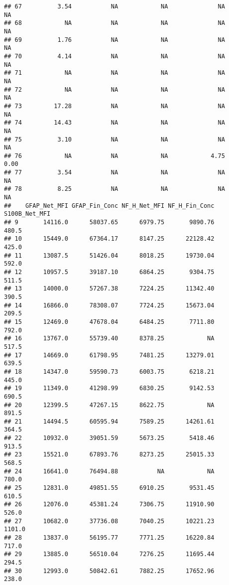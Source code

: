 \documentclass[]{article}
\begin{document}
\begin{verbatim}
## 67          3.54           NA            NA              NA               NA
## 68            NA           NA            NA              NA               NA
## 69          1.76           NA            NA              NA               NA
## 70          4.14           NA            NA              NA               NA
## 71            NA           NA            NA              NA               NA
## 72            NA           NA            NA              NA               NA
## 73         17.28           NA            NA              NA               NA
## 74         14.43           NA            NA              NA               NA
## 75          3.10           NA            NA              NA               NA
## 76            NA           NA            NA            4.75             0.00
## 77          3.54           NA            NA              NA               NA
## 78          8.25           NA            NA              NA               NA
##    GFAP_Net_MFI GFAP_Fin_Conc NF_H_Net_MFI NF_H_Fin_Conc S100B_Net_MFI
## 9       14116.0      58037.65      6979.75       9890.76         480.5
## 10      15449.0      67364.17      8147.25      22128.42         425.0
## 11      13087.5      51426.04      8018.25      19730.04         592.0
## 12      10957.5      39187.10      6864.25       9304.75         511.5
## 13      14000.0      57267.38      7224.25      11342.40         390.5
## 14      16866.0      78308.07      7724.25      15673.04         209.5
## 15      12469.0      47678.04      6484.25       7711.80         792.0
## 16      13767.0      55739.40      8378.25            NA         517.5
## 17      14669.0      61798.95      7481.25      13279.01         639.5
## 18      14347.0      59590.73      6003.75       6218.21         445.0
## 19      11349.0      41298.99      6830.25       9142.53         690.5
## 20      12399.5      47267.15      8622.75            NA         891.5
## 21      14494.5      60595.94      7589.25      14261.61         364.5
## 22      10932.0      39051.59      5673.25       5418.46         913.5
## 23      15521.0      67893.76      8273.25      25015.33         568.5
## 24      16641.0      76494.88           NA            NA         780.0
## 25      12831.0      49851.55      6910.25       9531.45         610.5
## 26      12076.0      45381.24      7306.75      11910.90         526.0
## 27      10682.0      37736.08      7040.25      10221.23        1101.0
## 28      13837.0      56195.77      7771.25      16220.84         717.0
## 29      13885.0      56510.04      7276.25      11695.44         294.5
## 30      12993.0      50842.61      7882.25      17652.96         238.0

\end{verbatim}
\end{document}
